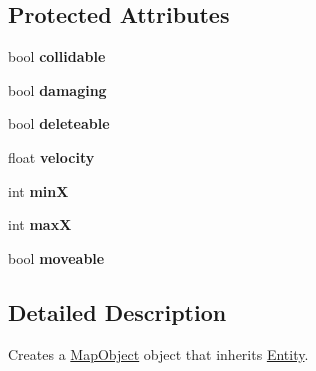 \subsection*{Protected Attributes}
\begin{DoxyCompactItemize}
\item 
\hypertarget{class_map_object_a1d900ea8b9825881d5116711569b5e11}{bool {\bfseries collidable}}\label{class_map_object_a1d900ea8b9825881d5116711569b5e11}

\item 
\hypertarget{class_map_object_aa7f81dc2db7b5cdf0267717dee175d62}{bool {\bfseries damaging}}\label{class_map_object_aa7f81dc2db7b5cdf0267717dee175d62}

\item 
\hypertarget{class_map_object_a9c72b4c12be7a1b9c26adb3cfa10f029}{bool {\bfseries deleteable}}\label{class_map_object_a9c72b4c12be7a1b9c26adb3cfa10f029}

\item 
\hypertarget{class_map_object_ad264ede115023b6580fab8d96c00e707}{float {\bfseries velocity}}\label{class_map_object_ad264ede115023b6580fab8d96c00e707}

\item 
\hypertarget{class_map_object_a50163ed099aade812e9b00282ce9c14e}{int {\bfseries min\+X}}\label{class_map_object_a50163ed099aade812e9b00282ce9c14e}

\item 
\hypertarget{class_map_object_a858676fc64011d2421ae2ff6fd5fff79}{int {\bfseries max\+X}}\label{class_map_object_a858676fc64011d2421ae2ff6fd5fff79}

\item 
\hypertarget{class_map_object_abb5be5d79fe67286a59b6948d9da48ef}{bool {\bfseries moveable}}\label{class_map_object_abb5be5d79fe67286a59b6948d9da48ef}

\end{DoxyCompactItemize}


\subsection{Detailed Description}
Creates a \hyperlink{class_map_object}{Map\+Object} object that inherits \hyperlink{class_entity}{Entity}. 


